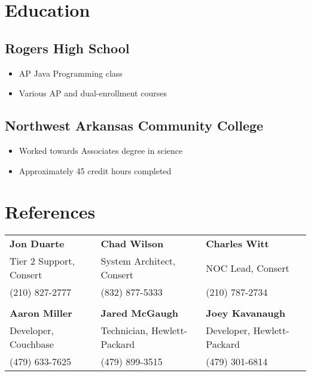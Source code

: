 \documentclass[10pt]{article}
\begin{document}
\section*{Education}
\subsection*{Rogers High School}
\begin{itemize}
    \item AP Java Programming class
    \item Various AP and dual-enrollment courses
\end{itemize}

\subsection*{Northwest Arkansas Community College}
\begin{itemize}
    \item Worked towards Associates degree in science
    \item Approximately 45 credit hours completed
\end{itemize}

\section*{References}
\begin{tabular}{l l l}
\textbf{Jon Duarte} & \textbf{Chad Wilson} & \textbf{Charles Witt} \\
Tier 2 Support, Consert & System Architect, Consert & NOC Lead, Consert\\
(210) 827-2777 & (832) 877-5333 & (210) 787-2734\\
\\
\textbf{Aaron Miller} & \textbf{Jared McGaugh} & \textbf{Joey Kavanaugh} \\
Developer, Couchbase & Technician, Hewlett-Packard & Developer, Hewlett-Packard\\
(479) 633-7625 & (479) 899-3515 & (479) 301-6814\\
\end{tabular}
\end{document}
